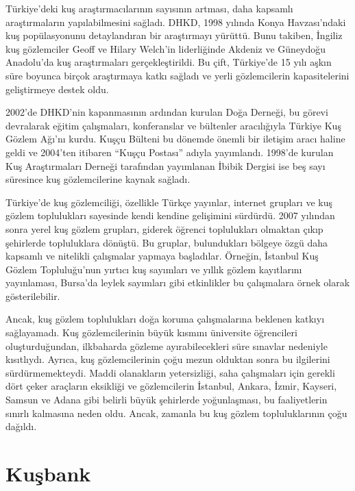 \documentclass[
  a4paper,
  DIV=11,
  numbers=noendperiod]{scrartcl}
\begin{document}
Türkiye'deki kuş araştırmacılarının sayısının artması, daha kapsamlı
araştırmaların yapılabilmesini sağladı. DHKD, 1998 yılında Konya
Havzası'ndaki kuş popülasyonunu detaylandıran bir araştırmayı yürüttü.
Bunu takiben, İngiliz kuş gözlemciler Geoff ve Hilary Welch'in
liderliğinde Akdeniz ve Güneydoğu Anadolu'da kuş araştırmaları
gerçekleştirildi. Bu çift, Türkiye'de 15 yılı aşkın süre boyunca birçok
araştırmaya katkı sağladı ve yerli gözlemcilerin kapasitelerini
geliştirmeye destek oldu.

2002'de DHKD'nin kapanmasının ardından kurulan Doğa Derneği, bu görevi
devralarak eğitim çalışmaları, konferanslar ve bültenler aracılığıyla
Türkiye Kuş Gözlem Ağı'nı kurdu. Kuşçu Bülteni bu dönemde önemli bir
iletişim aracı haline geldi ve 2004'ten itibaren ``Kuşçu Postası''
adıyla yayımlandı. 1998'de kurulan Kuş Araştırmaları Derneği tarafından
yayımlanan İbibik Dergisi ise beş sayı süresince kuş gözlemcilerine
kaynak sağladı.

Türkiye'de kuş gözlemciliği, özellikle Türkçe yayınlar, internet
grupları ve kuş gözlem toplulukları sayesinde kendi kendine gelişimini
sürdürdü. 2007 yılından sonra yerel kuş gözlem grupları, giderek öğrenci
toplulukları olmaktan çıkıp şehirlerde topluluklara dönüştü. Bu gruplar,
bulundukları bölgeye özgü daha kapsamlı ve nitelikli çalışmalar yapmaya
başladılar. Örneğin, İstanbul Kuş Gözlem Topluluğu'nun yırtıcı kuş
sayımları ve yıllık gözlem kayıtlarını yayınlaması, Bursa'da leylek
sayımları gibi etkinlikler bu çalışmalara örnek olarak gösterilebilir.

Ancak, kuş gözlem toplulukları doğa koruma çalışmalarına beklenen
katkıyı sağlayamadı. Kuş gözlemcilerinin büyük kısmını üniversite
öğrencileri oluşturduğundan, ilkbaharda gözleme ayırabilecekleri süre
sınavlar nedeniyle kısıtlıydı. Ayrıca, kuş gözlemcilerinin çoğu mezun
olduktan sonra bu ilgilerini sürdürmemekteydi. Maddi olanakların
yetersizliği, saha çalışmaları için gerekli dört çeker araçların
eksikliği ve gözlemcilerin İstanbul, Ankara, İzmir, Kayseri, Samsun ve
Adana gibi belirli büyük şehirlerde yoğunlaşması, bu faaliyetlerin
sınırlı kalmasına neden oldu. Ancak, zamanla bu kuş gözlem
topluluklarının çoğu dağıldı.

\section*{Kuşbank}\label{kuux15fbank}

\end{document}
